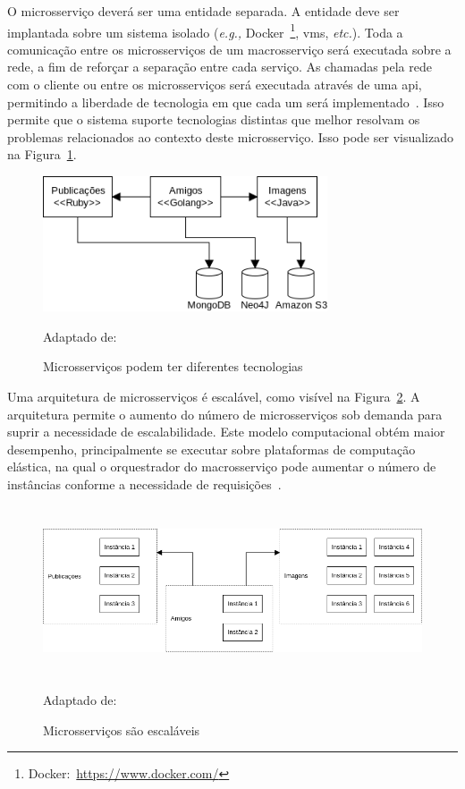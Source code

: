 O microsserviço deverá ser uma entidade separada.
%
A entidade deve ser implantada sobre um sistema isolado (\textit{e.g.,} Docker~\footnote{Docker:~\url{https://www.docker.com/}}, \acp{vm}, \textit{etc.}).
%
Toda a comunicação entre os microsserviços de um macrosserviço será executada sobre a rede, a fim de reforçar a separação entre cada serviço.
%
As chamadas pela rede com o cliente ou entre os microsserviços será executada através de uma \ac{api}, permitindo a liberdade de tecnologia em que cada um será implementado~\cite{Newman2015Feb}.
%
Isso permite que o sistema suporte tecnologias distintas que melhor resolvam os problemas relacionados ao contexto deste microsserviço.
%
Isso pode ser visualizado na Figura~\ref{fig:microsservicos_tecnologias}.



\begin{figure}[htb!]
\caption{Microsserviços podem ter diferentes tecnologias}
\label{fig:microsservicos_tecnologias}
\includegraphics[height=4cm]{img/cap2/microsservicos_tecnologias.png}
\centering

Adaptado de:~\cite{Newman2015Feb}
\end{figure}


Uma arquitetura de microsserviços é escalável, como visível na Figura~\ref{fig:microsservicos_escalabilidade}.
%
A arquitetura permite o aumento do número de microsserviços sob demanda para suprir a necessidade de escalabilidade.
%
Este modelo computacional obtém maior desempenho, principalmente se executar sobre plataformas de computação elástica, na qual o orquestrador do macrosserviço pode aumentar o número de instâncias conforme a necessidade de requisições~\cite{Nadareishvili2016Aug}.



\begin{figure}[htb!]
\caption{Microsserviços são escaláveis}
\label{fig:microsservicos_escalabilidade}
\includegraphics[height=5cm]{img/cap2/microsservicos_escalabilidade.png}
\centering

Adaptado de:~\cite{Newman2015Feb}
\end{figure}



